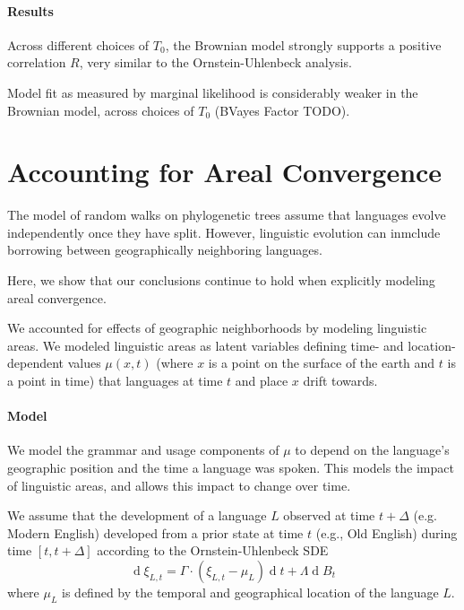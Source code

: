 \documentclass[11pt,a4paper]{article}
\begin{document}
\paragraph{Results}
Across different choices of $T_0$, the Brownian model strongly supports a positive correlation $R$, very similar to the Ornstein-Uhlenbeck analysis.

Model fit as measured by marginal likelihood is considerably weaker in the Brownian model, across choices of $T_0$ (BVayes Factor TODO).



\section{Accounting for Areal Convergence}
The model of random walks on phylogenetic trees assume that languages evolve independently once they have split.
However, linguistic evolution can inmclude borrowing between geographically neighboring languages.

Here, we show that our conclusions continue to hold when explicitly modeling areal convergence.

We accounted for effects of geographic neighborhoods by modeling linguistic areas.
We modeled linguistic areas as latent variables defining time- and location-dependent values $\mu(x,t)$ (where $x$ is a point on the surface of the earth and $t$ is a point in time) that languages at time $t$ and place $x$ drift towards.

\paragraph{Model}
We model the grammar and usage components of $\mu$ to depend on the language's geographic position and the time a language was spoken.
This models the impact of linguistic areas, and allows this impact to change over time.

We assume that the development of a language $L$ observed at time $t+\Delta$ (e.g. Modern English) developed from a prior state at time $t$ (e.g., Old English) during time $[t, t+\Delta]$ according to the Ornstein-Uhlenbeck SDE
\begin{equation*}
    \operatorname{d}\xi_{L,t} = \Gamma \cdot (\xi_{L,t}-\mu_L) \operatorname{d}t + \Lambda \operatorname{d}B_t
\end{equation*}
where $\mu_L$ is defined by the temporal and geographical location of the language $L$.
\end{document}
